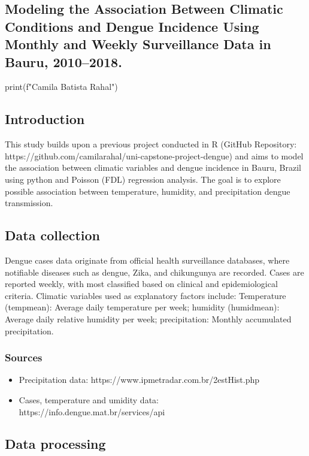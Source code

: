 \documentclass{article}
\begin{document}
\begin{center}
\section*{Modeling the Association Between Climatic Conditions and Dengue Incidence Using Monthly and Weekly Surveillance Data in Bauru, 2010–2018.}

\begin{pycode}
print(f"Camila Batista Rahal")
\end{pycode}
\end{center}

\subsection*{Introduction}
This study builds upon a previous project conducted in R (GitHub Repository: https://github.com/camilarahal/uni-capstone-project-dengue) and aims to model the association between climatic variables and dengue incidence in Bauru, Brazil using python and Poisson (FDL) regression analysis. The goal is to explore possible association between temperature, humidity, and precipitation  dengue transmission.


\subsection*{Data collection}
Dengue cases data originate from official health surveillance databases, where notifiable diseases such as dengue, Zika, and chikungunya are recorded. Cases are reported weekly, with most classified based on clinical and epidemiological criteria. Climatic variables used as explanatory factors include: Temperature (tempmean): Average daily temperature per week; humidity (humidmean): Average daily relative humidity per week; precipitation: Monthly accumulated precipitation.

\subsubsection*{Sources}

\begin{itemize}
    \item Precipitation data: https://www.ipmetradar.com.br/2estHist.php
    \item Cases, temperature and umidity data: https://info.dengue.mat.br/services/api
\end{itemize}

\subsection*{Data processing}
\end{document}
